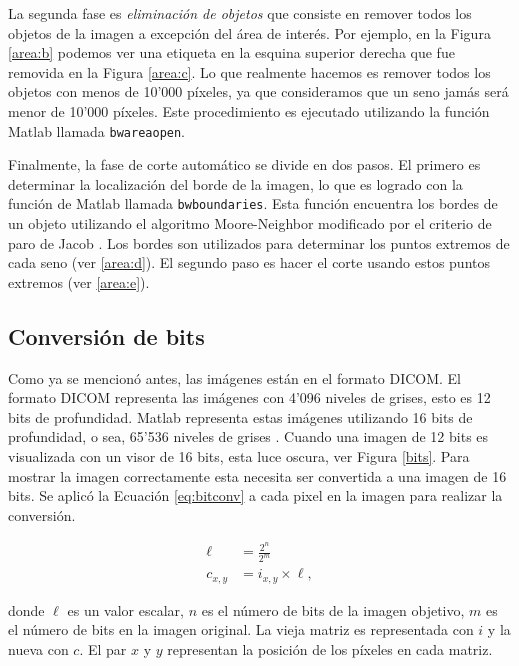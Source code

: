La segunda fase es \textit{eliminación de objetos} que consiste en remover
todos los objetos de la imagen a excepción del área de interés. Por ejemplo, en
la Figura \ref{area:b} podemos ver una etiqueta en la esquina superior derecha
que fue removida en la Figura \ref{area:c}. Lo que realmente hacemos es remover
todos los objetos con menos de 10'000 píxeles, ya que consideramos que un seno
jamás será menor de 10'000 píxeles. Este procedimiento es ejecutado utilizando
la función Matlab llamada \texttt{bwareaopen}.

Finalmente, la fase de corte automático se divide en dos pasos. El primero es
determinar la localización del borde de la imagen, lo que es logrado con la
función de Matlab llamada \texttt{bwboundaries}. Esta función encuentra los
bordes de un objeto utilizando el algoritmo Moore-Neighbor modificado por el
criterio de paro de Jacob \cite{gonzalez2009digital}. Los bordes son utilizados
para determinar los puntos extremos de cada seno (ver \ref{area:d}). El segundo
paso es hacer el corte usando estos puntos extremos (ver \ref{area:e}). 

\subsection{Conversión de bits}

Como ya se mencionó antes, las imágenes están en el formato DICOM. El formato
DICOM representa las imágenes con 4'096 niveles de grises, esto es 12 bits de
profundidad. Matlab representa estas imágenes utilizando 16 bits de
profundidad, o sea, 65'536 niveles de grises \cite{mustra2008efficient}. Cuando
una imagen de 12 bits es visualizada con un visor de 16 bits, esta luce oscura,
ver Figura \ref{bits}. Para mostrar la imagen correctamente esta necesita ser
convertida a una imagen de 16 bits. Se aplicó la Ecuación \ref{eq:bitconv} a
cada pixel en la imagen para realizar la conversión.

\begin{equation}
\label{eq:bitconv}
    \begin{split}
            \ell &= \frac{2^{n}}{2^{m}} \\
            c_{x,y} &= i_{x, y} \times \ell,
    \end{split}
\end{equation}

\noindent donde $\ell$ es un valor escalar, $n$ es el número de bits de la imagen
objetivo, $m$ es el número de bits en la imagen original. La vieja matriz es
representada con $i$ y la nueva con $c$. El par $x$ y $y$ representan la
posición de los píxeles en cada matriz.

